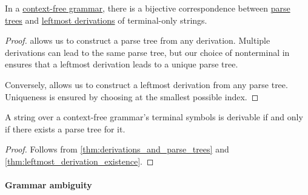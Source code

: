 \begin{proposition}\label{thm:derivations_and_parse_trees}
  In a \hyperref[def:chomsky_hierarchy/context_free]{context-free grammar}, there is a bijective correspondence between \hyperref[def:parse_tree]{parse trees} and \hyperref[def:leftmost_derivation]{leftmost derivations} of terminal-only strings.
\end{proposition}
\begin{proof}
   allows us to construct a parse tree from any derivation. Multiple derivations can lead to the same parse tree, but our choice of nonterminal in  ensures that a leftmost derivation leads to a unique parse tree.

  Conversely,  allows us to construct a leftmost derivation from any parse tree. Uniqueness is ensured by choosing at  the smallest possible index.
\end{proof}

\begin{corollary}\label{thm:parse_tree_existence}
  A string over a context-free grammar's terminal symbols is derivable if and only if there exists a parse tree for it.
\end{corollary}
\begin{proof}
  Follows from \cref{thm:derivations_and_parse_trees} and \cref{thm:leftmost_derivation_existence}.
\end{proof}

\paragraph{Grammar ambiguity}

